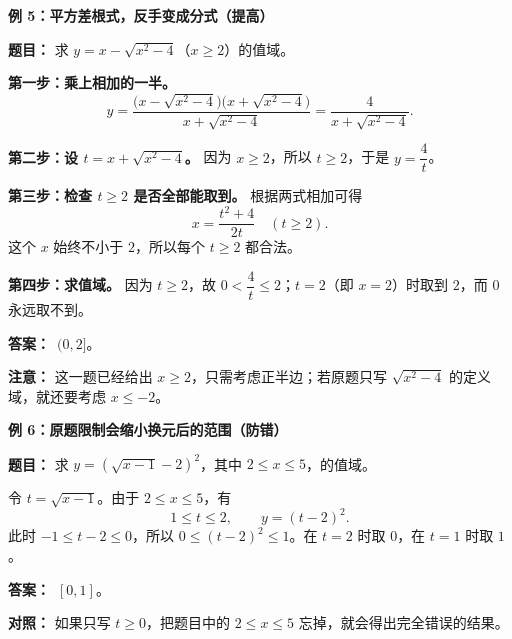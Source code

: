 \begin{examplebox}
  \medskip
  \textbf{\textcolor{CExample}{例 5：平方差根式，反手变成分式（提高）}}

  \textbf{题目：} 求 $y=x-\sqrt{x^2-4}$（$x\ge2$）的值域。

  \textbf{第一步：乘上相加的一半。}
  \[
    y=\frac{\bigl(x-\sqrt{x^2-4}\bigr)\bigl(x+\sqrt{x^2-4}\bigr)}{x+\sqrt{x^2-4}}
     =\frac{4}{x+\sqrt{x^2-4}}.
  \]

  \textbf{第二步：设 $t=x+\sqrt{x^2-4}$。} 因为 $x\ge2$，所以 $t\ge2$，于是 $y=\dfrac4t$。

  \textbf{第三步：检查 $t\ge2$ 是否全部能取到。} 根据两式相加可得
  \[
    x=\frac{t^2+4}{2t}\quad(t\ge2).
  \]
  这个 $x$ 始终不小于 $2$，所以每个 $t\ge2$ 都合法。

  \textbf{第四步：求值域。} 因为 $t\ge2$，故 $0<\dfrac4t\le2$；$t=2$（即 $x=2$）时取到 $2$，而 $0$ 永远取不到。

  \textbf{答案：}\ $\boxed{(0,2]}$。

  \textbf{注意：} 这一题已经给出 $x\ge2$，只需考虑正半边；若原题只写 $\sqrt{x^2-4}$ 的定义域，就还要考虑 $x\le-2$。

  \medskip
  \begin{minipage}{\linewidth}
\textbf{\textcolor{CExample}{例 6：原题限制会缩小换元后的范围（防错）}}
\begin{center}\end{center}
\end{minipage}



  \textbf{题目：} 求 $y=(\sqrt{x-1}-2)^2$，其中 $2\le x\le5$，的值域。

  令 $t=\sqrt{x-1}$。由于 $2\le x\le5$，有
  \[
    1\le t\le2,\qquad y=(t-2)^2.
  \]
  此时 $-1\le t-2\le0$，所以 $0\le(t-2)^2\le1$。在 $t=2$ 时取 $0$，在 $t=1$ 时取 $1$。

  \textbf{答案：}\ $\boxed{[0,1]}$。

  \textbf{对照：} 如果只写 $t\ge0$，把题目中的 $2\le x\le5$ 忘掉，就会得出完全错误的结果。
\end{examplebox}
